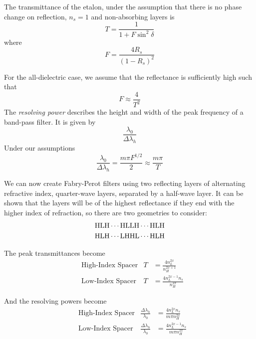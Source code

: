 \documentclass{article}
\begin{document}
    The transmittance of the etalon, under the assumption that there is no phase change on reflection, $n_s = 1$ and non-absorbing layers is
    \begin{equation}
        T = \frac{1}{1 + F \sin^2 \delta}
    \end{equation}
    where
    \begin{equation}
        F = \frac{4 R_s}{\left(1-R_s\right)^2}
    \end{equation}

    For the all-dielectric case, we assume that the reflectance is sufficiently high such that
    \begin{equation}
        F \approx \frac{4}{T^2}
    \end{equation}
    The \emph{resolving power} describes the height and width of the peak frequency of a band-pass filter. It is given by
    \begin{equation*}
        \frac{\lambda_0}{\Delta \lambda_h}
    \end{equation*}
    Under our assumptions
    \begin{equation}
        \frac{\lambda_0}{\Delta \lambda_h} = \frac{m \pi F^{1/2}}{2} \approx \frac{m \pi}{T}
    \end{equation}

    We can now create Fabry-Perot filters using two reflecting layers of alternating refractive index, quarter-wave layers, separated by a half-wave layer. It can be shown that the layers will be of the highest reflectance if they end with the higher index of refraction, so there are two geometries to consider:
    \begin{align*}
        \ce{HLH} \cdots \ce{HLLH} \cdots \ce{HLH} \\
        \ce{HLH} \cdots \ce{LHHL} \cdots \ce{HLH}
    \end{align*}

    The peak transmittances become
    \begin{align}
        &\text{High-Index Spacer} &T &= \frac{4 n_L^{2x}}{n_H^{2x+1}}  \\
        &\text{Low-Index Spacer} &T &= \frac{4 n_L^{2x -1} n_s}{n_H^{2x}}       
    \end{align}
    
    And the resolving powers become
    \begin{align}
        &\text{High-Index Spacer} &\frac{\Delta \lambda_h}{\lambda_0} &= \frac{4 n_L^{2x} n_s}{m \pi n_H^{2x}}  \\
        &\text{Low-Index Spacer} &\frac{\Delta \lambda_h}{\lambda_0} &= \frac{4 n_L^{2x-1} n_s}{m \pi n_H^{2x}}
    \end{align}
\end{document}
